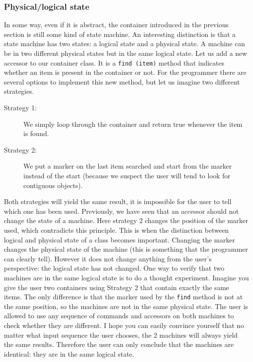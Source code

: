 \documentclass[12pt]{article}
\begin{document}
\subsubsection{Physical/logical state}
In some way, even if it is abstract, the container introduced in the previous section is still some kind of state machine. An interesting distinction is that a state machine has two states: a logical state and a physical state. A machine can be in two different physical states but in the same logical state. Let us add a new accessor to our container class. It is a \texttt{find (item)} method that indicates whether an item is present in the container or not. For the programmer there are several options to implement this new method, but let us imagine two different strategies.
\begin{description}
	\item[Strategy 1:] We simply loop through the container and return true whenever the item is found.
	\item[Strategy 2:] We put a marker on the last item searched and start from the marker instead of the start (because we suspect the user will tend to look for contiguous objects).
\end{description}
Both strategies will yield the same result, it is impossible for the user to tell which one has been used. Previously, we have seen that an accessor should not change the state of a machine. Here strategy 2 changes the position of the marker used, which contradicts this principle. This is when the distinction between logical and physical state of a class becomes important. Changing the marker changes the physical state of the machine (this is something that the programmer can clearly tell). However it does not change anything from the user's perspective: the logical state has not changed. One way to verify that two machines are in the same logical state is to do a thought experiment. Imagine you give the user two containers using Strategy 2 that contain exactly the same items. The only difference is that the marker used by the \texttt{find} method is not at the same position, so the machines are not in the same physical state. The user is allowed to use any sequence of commands and accessors on both machines to check whether they are different. I hope you can easily convince yourself that no matter what input sequence the user chooses, the 2 machines will always yield the same results. Therefore the user can only conclude that the machines are identical: they are in the same logical state.
\end{document}
